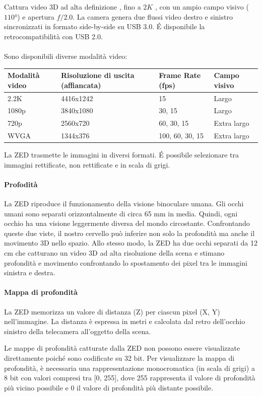 \documentclass[a4paper]{article}
\begin{document}
Cattura video 3D ad alta definizione , fino a $2K $ , con un ampio campo visivo ($\ang{110}$) e apertura $f/2.0$. La camera genera due flussi video destro e sinistro sincronizzati in formato side-by-side su USB 3.0. \'E disponibile la retrocompatibilità con USB 2.0.
\\
\\
Sono disponibili diverse modalità video:
\begin{center}
\begin{tabular}{llll}
\toprule
Modalità video &Risoluzione di uscita (affiancata) &	Frame Rate (fps) &	Campo visivo \\
\midrule
2.2K&	4416x1242&	15	 &Largo \\
1080p	&3840x1080&	30, 15&	Largo\\
720p&	2560x720&	60, 30, 15&	Extra largo\\
WVGA&	1344x376&	100, 60, 30, 15&	Extra largo\\
\bottomrule
\end{tabular}
\end{center}
La ZED trasmette le immagini in diversi formati. 
\'E possibile selezionare tra immagini rettificate, non rettificate e in scala di grigi.
\paragraph{Profodità}
La ZED riproduce il funzionamento della visione binoculare umana. Gli occhi umani sono separati orizzontalmente di circa 65 mm in media. Quindi, ogni occhio ha una visione leggermente diversa del mondo circostante. Confrontando queste due viste, il nostro cervello può inferire non solo la profondità ma anche il movimento 3D nello spazio. Allo stesso modo, la ZED ha due occhi separati da 12 cm che catturano un video 3D ad alta risoluzione della scena e stimano profondità e movimento confrontando lo spostamento dei pixel tra le immagini sinistra e destra.
\paragraph{Mappa di profondità}
La ZED memorizza un valore di distanza (Z) per ciascun pixel (X, Y) nell'immagine. La distanza è espressa in  metri e calcolata dal retro dell'occhio sinistro della telecamera all'oggetto della scena.

Le mappe di profondità catturate dalla ZED non possono essere visualizzate direttamente poiché sono codificate su 32 bit. Per visualizzare la mappa di profondità, è necessaria una rappresentazione monocromatica (in scala di grigi) a 8 bit con valori compresi tra [0, 255], dove 255 rappresenta il valore di profondità più vicino possibile e 0 il valore di profondità più distante possibile.
\end{document}
